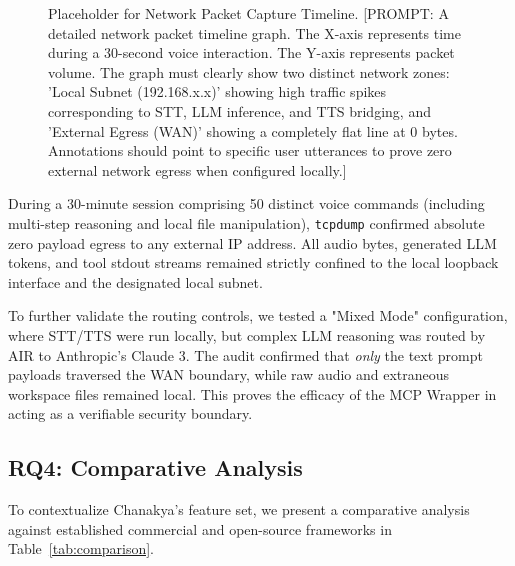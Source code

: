 \documentclass[conference]{IEEEtran}
\begin{document}
\begin{figure}[htbp]
\centerline{
    \fbox{\rule{0pt}{2.5in} \rule{0.9\linewidth}{0pt}}
}
\caption{Placeholder for Network Packet Capture Timeline. [PROMPT: A detailed network packet timeline graph. The X-axis represents time during a 30-second voice interaction. The Y-axis represents packet volume. The graph must clearly show two distinct network zones: 'Local Subnet (192.168.x.x)' showing high traffic spikes corresponding to STT, LLM inference, and TTS bridging, and 'External Egress (WAN)' showing a completely flat line at 0 bytes. Annotations should point to specific user utterances to prove zero external network egress when configured locally.]}
\label{fig:netaudit}
\end{figure}

During a 30-minute session comprising 50 distinct voice commands (including multi-step reasoning and local file manipulation), \texttt{tcpdump} confirmed absolute zero payload egress to any external IP address. All audio bytes, generated LLM tokens, and tool stdout streams remained strictly confined to the local loopback interface and the designated local subnet.

To further validate the routing controls, we tested a "Mixed Mode" configuration, where STT/TTS were run locally, but complex LLM reasoning was routed by AIR to Anthropic's Claude 3. The audit confirmed that \textit{only} the text prompt payloads traversed the WAN boundary, while raw audio and extraneous workspace files remained local. This proves the efficacy of the MCP Wrapper in acting as a verifiable security boundary.

\subsection{RQ4: Comparative Analysis}
To contextualize Chanakya's feature set, we present a comparative analysis against established commercial and open-source frameworks in Table~\ref{tab:comparison}.
\end{document}
